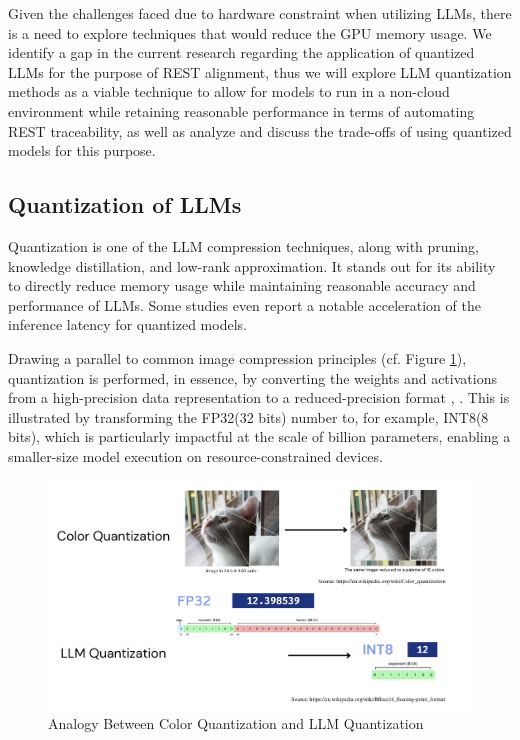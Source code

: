 \documentclass[conference]{IEEEtran}
\begin{document}

Given the challenges faced due to hardware constraint when utilizing LLMs, there
is a need to explore techniques that would reduce the GPU memory usage. We
identify a gap in the current research regarding the application of quantized
LLMs for the purpose of REST alignment, thus we will explore LLM quantization
methods as a viable technique to allow for models to run in a non-cloud
environment while retaining reasonable performance in terms of automating REST
traceability, as well as analyze and discuss the trade-offs of using quantized
models for this purpose.

\subsection{Quantization of LLMs}

Quantization is one of the LLM compression techniques, along with pruning, knowledge distillation, and low-rank approximation\cite{bai2024beyond}. It stands out for its ability to directly reduce memory usage while maintaining reasonable accuracy and performance of LLMs. Some studies even report a notable acceleration of the inference latency for quantized models\cite{shen2024exploring}.

Drawing a parallel to common image compression principles (cf. Figure \ref{fig:quantvisual}), quantization is performed, in essence, by converting the weights and activations from a high-precision data representation to a reduced-precision format \cite{zhao2025benchmarking}, \cite{bai2024beyond}. This is illustrated by transforming the FP32(32 bits) number to, for example, INT8(8 bits), which is particularly impactful at the scale of billion parameters, enabling a smaller-size model execution on resource-constrained devices.

\begin{figure}
    \flushleft
    \includegraphics[width=\columnwidth]{img}
    \caption{Analogy Between Color Quantization and LLM Quantization}
    \label{fig:quantvisual}
\end{figure}
\end{document}
